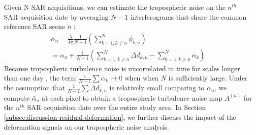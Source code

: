 \documentclass{utexasthesis}
\begin{document}
Given N SAR acquisitions, we can estimate the tropospheric noise on the $n^{th}$ SAR acquisition date by averaging $N-1$ interferograms that share the common reference SAR scene $n$ \cite{Tymofyeyeva2015MitigationAtmosphericPhase}:
\begin{multline}
\bar{\alpha}_n = \frac{\lambda}{4 \pi} \frac{1}{N-1} \left(\sum_{k=1, k \neq n}^{N} \phi_{k,n}\right)  \\
=  \alpha_n  + \frac{1}{N-1} \left( \sum_{k=1, k \neq n}^{N}  \Delta d_{k,n} - \sum_{k=1, k \neq n}^{N}  \alpha_k  \right)  \label{eq:avg-ifg} 
\end{multline}
Because tropospheric turbulence noise is uncorrelated in time for scales longer than one day \cite{Emardson2003NeutralAtmosphericDelay, Onn2006ModelingWaterVapor}, the term $ \frac{1}{N-1} \sum \alpha_k \rightarrow 0$ when  when $N$ is sufficiently large. 
Under the assumption that $ \frac{1}{N-1} \sum \Delta d_{k,n} $ is relatively small comparing to $\alpha_n$, we compute $ \bar{\alpha}_n $ at each pixel to obtain a tropospheric turbulence noise map $A^{(n)}$ for the $n^{th}$ SAR acquisition date over the entire study area. In Section \ref{subsec:discussion-residual-deformation}, we further discuss the impact of the deformation signals on our tropospheric noise analysis.
\end{document}
